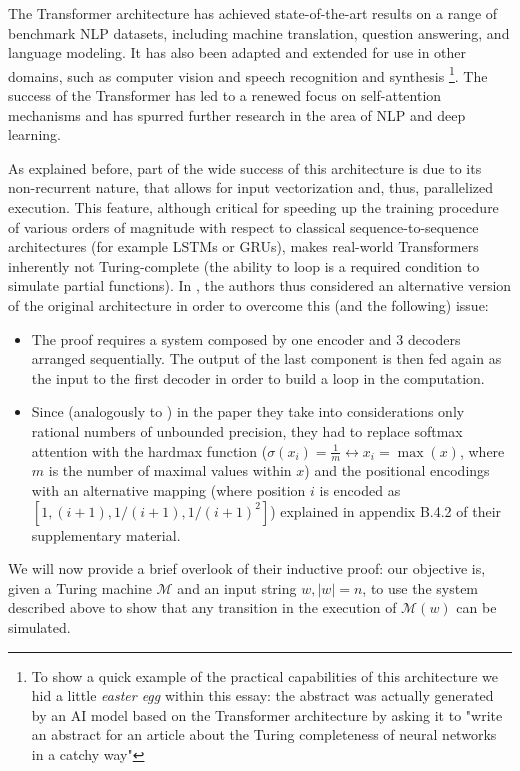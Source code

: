 \documentclass{article}
\begin{document}
The Transformer architecture has achieved state-of-the-art results on a range of benchmark NLP datasets, including machine translation, question answering, and language modeling. It has also been adapted and extended for use in other domains, such as computer vision and speech recognition and synthesis \footnote{To show a quick example of the practical capabilities of this architecture we hid a little \textit{easter egg} within this essay: the abstract was actually generated by an AI model based on the Transformer architecture by asking it to "write an abstract for an article about the Turing completeness of neural networks in a catchy way"}. The success of the Transformer has led to a renewed focus on self-attention mechanisms and has spurred further research in the area of NLP and deep learning.

As explained before, part of the wide success of this architecture is due to its non-recurrent nature, that allows for input vectorization and, thus, parallelized execution. This feature, although critical for speeding up the training procedure of various orders of magnitude with respect to classical sequence-to-sequence architectures (for example LSTMs or GRUs), makes real-world Transformers inherently not Turing-complete (the ability to loop is a required condition to simulate partial functions). In \cite{PER19}, the authors thus considered an alternative version of the original architecture in order to overcome this (and the following) issue:

\begin{itemize}
    \item The proof requires a system composed by one encoder and 3 decoders arranged sequentially. The output of the last component is then fed again as the input to the first decoder in order to build a loop in the computation.
    \item Since (analogously to \cite{SIE95}) in the paper they take into considerations only rational numbers of unbounded precision, they had to replace softmax attention with the hardmax function ($\sigma(x_i)=\frac{1}{m} \leftrightarrow x_i = \max(x)$, where $m$ is the number of maximal values within $x$) and the positional encodings with an alternative mapping (where position $i$ is encoded as $[1, (i+1), 1/(i+1), 1/(i+1)^2]$) explained in appendix B.4.2 of their supplementary material.
\end{itemize}

We will now provide a brief overlook of their inductive proof: our objective is, given a Turing machine $\mathcal{M}$ and an input string $w, |w|=n$, to use the system described above to show that any transition in the execution of $\mathcal{M}(w)$ can be simulated.
\end{document}
